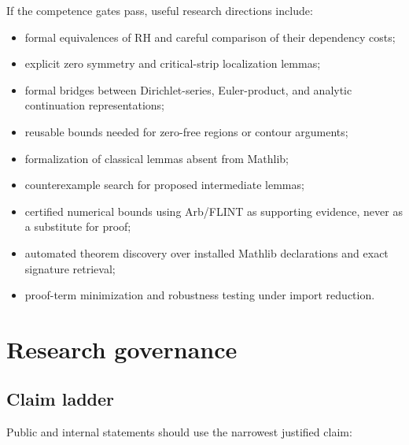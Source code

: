 \documentclass[11pt,a4paper]{article}
\begin{document}
If the competence gates pass, useful research directions include:

\begin{itemize}
  \item formal equivalences of RH and careful comparison of their dependency
  costs;
  \item explicit zero symmetry and critical-strip localization lemmas;
  \item formal bridges between Dirichlet-series, Euler-product, and analytic
  continuation representations;
  \item reusable bounds needed for zero-free regions or contour arguments;
  \item formalization of classical lemmas absent from Mathlib;
  \item counterexample search for proposed intermediate lemmas;
  \item certified numerical bounds using Arb/FLINT as supporting evidence,
  never as a substitute for proof;
  \item automated theorem discovery over installed Mathlib declarations and
  exact signature retrieval;
  \item proof-term minimization and robustness testing under import reduction.
\end{itemize}

\section{Research governance}

\subsection{Claim ladder}

Public and internal statements should use the narrowest justified claim:
\end{document}
